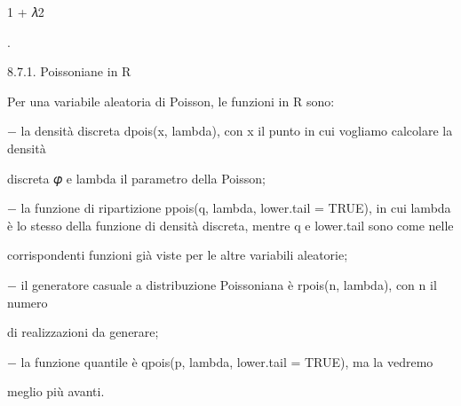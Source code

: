 \documentclass[a4paper,portrait,12pt]{article}
\begin{document}
\begin{flushleft}
1 + 𝜆2
\end{flushleft}





.





\begin{flushleft}
8.7.1. Poissoniane in R
\end{flushleft}


\begin{flushleft}
Per una variabile aleatoria di Poisson, le funzioni in R sono:
\end{flushleft}


\begin{flushleft}
$-$ la densit\`{a} discreta dpois(x, lambda), con x il punto in cui vogliamo calcolare la densit\`{a}
\end{flushleft}


\begin{flushleft}
discreta 𝜑 e lambda il parametro della Poisson;
\end{flushleft}


\begin{flushleft}
$-$ la funzione di ripartizione ppois(q, lambda, lower.tail = TRUE), in cui lambda \`{e} lo stesso della funzione di densit\`{a} discreta, mentre q e lower.tail sono come nelle
\end{flushleft}


\begin{flushleft}
corrispondenti funzioni gi\`{a} viste per le altre variabili aleatorie;
\end{flushleft}


\begin{flushleft}
$-$ il generatore casuale a distribuzione Poissoniana \`{e} rpois(n, lambda), con n il numero
\end{flushleft}


\begin{flushleft}
di realizzazioni da generare;
\end{flushleft}


\begin{flushleft}
$-$ la funzione quantile \`{e} qpois(p, lambda, lower.tail = TRUE), ma la vedremo
\end{flushleft}


\begin{flushleft}
meglio più avanti.
\end{flushleft}
\end{document}
